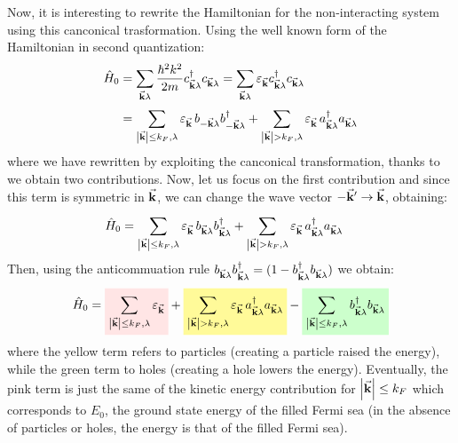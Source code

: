 \documentclass[../main/main.tex]{subfiles}
\begin{document}
Now, it is interesting to rewrite the Hamiltonian for the non-interacting system using this canconical trasformation. Using the well known form of the Hamiltonian in second quantization:
\begin{equation*}
\begin{split}
  \hat{H}_0 &= \sum_{\va{k}\lambda }^{} \frac{\hbar ^2k^2}{2m}  c_{\va{k}\lambda }^\dag c_{\va{k}\lambda }
  = \sum_{\va{k}\lambda }^{} \varepsilon _{\va{k}}  c_{\va{k}\lambda }^\dag c_{\va{k}\lambda }  \\
  &= \sum_{\abs{\va{k}}\le k_F, \lambda }^{} \varepsilon _{\va{k}} \,  b_{-\va{k}\lambda } b_{-\va{k}\lambda }^\dag
  + \sum_{\abs{\va{k}}> k_F, \lambda }^{} \varepsilon _{\va{k}} \,  a_{\va{k}\lambda }^\dag a_{\va{k}\lambda }
\end{split}
\end{equation*}
where we have rewritten by exploiting the canconical transformation, thanks to we obtain two contributions.
Now, let us focus on the first contribution and since this term is symmetric in \( \va{k} \), we can change the wave vector \( -\va{k}' \rightarrow \va{k} \), obtaining:
\begin{equation*}
\begin{split}
  \hat{H}_0 &=  \sum_{\abs{\va{k}}\le k_F, \lambda }^{} \varepsilon _{\va{k}} \,  b_{\va{k}\lambda } b_{\va{k}\lambda }^\dag
  + \sum_{\abs{\va{k}}> k_F, \lambda }^{} \varepsilon _{\va{k}} \,  a_{\va{k}\lambda }^\dag a_{\va{k}\lambda }
\end{split}
\end{equation*}
Then, using the anticommuation rule \( b_{\va{k}\lambda } b_{\va{k}\lambda }^\dag = (1 - b_{\va{k}\lambda }^\dag b_{\va{k}\lambda }) \) we obtain:
\begin{equation*}
  \hat{H}_0 =  \mathcolorbox{pink!40}{\sum_{\abs{\va{k}}\le k_F, \lambda }^{} \varepsilon _{\va{k}}}
  + \mathcolorbox{yellow!40}{\sum_{\abs{\va{k}}> k_F, \lambda }^{} \varepsilon _{\va{k}} \,  a_{\va{k}\lambda }^\dag a_{\va{k}\lambda }}
  - \mathcolorbox{green!20}{\sum_{\abs{\va{k}}\le k_F, \lambda }^{} b_{\va{k}\lambda }^\dag b_{\va{k}\lambda }}
\end{equation*}
where the yellow term refers to particles (creating a particle raised the energy), while the green term to holes (creating a hole lowers the energy). Eventually, the pink term is just the same of the kinetic energy contribution for \( \abs{\va{k}}\le k_F \) which corresponds to \( E_0 \), the ground state energy of the filled Fermi sea (in the absence of particles or holes, the energy is that of the filled Fermi sea).
\end{document}
